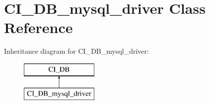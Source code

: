 \hypertarget{class_c_i___d_b__mysql__driver}{\section{C\-I\-\_\-\-D\-B\-\_\-mysql\-\_\-driver Class Reference}
\label{class_c_i___d_b__mysql__driver}
}
Inheritance diagram for C\-I\-\_\-\-D\-B\-\_\-mysql\-\_\-driver\-:\begin{figure}[H]
\begin{center}
\leavevmode
\includegraphics[height=2.000000cm]{class_c_i___d_b__mysql__driver}
\end{center}
\end{figure}
